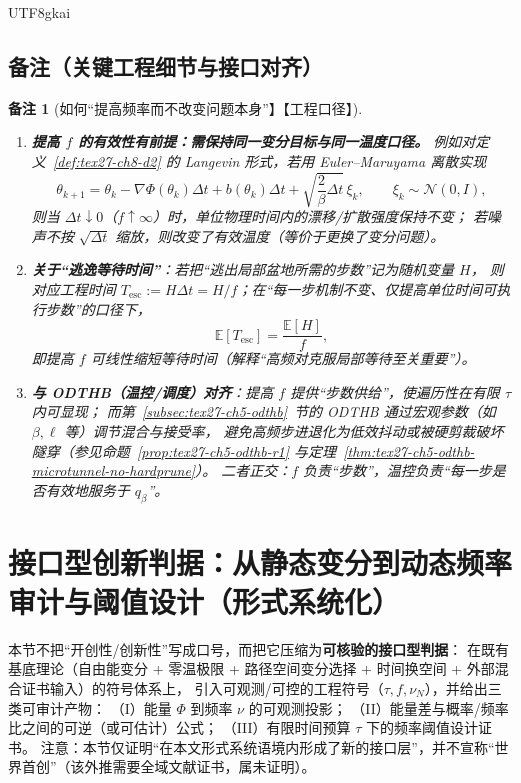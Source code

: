 \documentclass[12pt]{article}
\newtheorem{remark}{备注}[section]
\begin{document}
\begin{CJK*}{UTF8}{gkai}
\subsection{备注（关键工程细节与接口对齐）}
\label{subsec:tex27-ch21-remarks}

\begin{remark}[如何“提高频率而不改变问题本身”】【工程口径】]
\label{rem:tex27-ch21-r1}
\begin{enumerate}
  \item \textbf{提高 $f$ 的有效性有前提：需保持同一变分目标与同一温度口径。}
  例如对定义~\ref{def:tex27-ch8-d2} 的 Langevin 形式，若用 Euler--Maruyama 离散实现
  \[
    \theta_{k+1}
    =\theta_k-\nabla\Phi(\theta_k)\Delta t+b(\theta_k)\Delta t+\sqrt{\frac{2}{\beta}\Delta t}\,\xi_k,
    \qquad
    \xi_k\sim\mathcal{N}(0,I),
  \]
  则当 $\Delta t\downarrow 0$（$f\uparrow\infty$）时，单位物理时间内的漂移/扩散强度保持不变；
  若噪声不按 $\sqrt{\Delta t}$ 缩放，则改变了有效温度（等价于更换了变分问题）。
  \item \textbf{关于“逃逸等待时间”}：若把“逃出局部盆地所需的步数”记为随机变量 $H$，
  则对应工程时间 $T_{\mathrm{esc}}:=H\Delta t=H/f$；在“每一步机制不变、仅提高单位时间可执行步数”的口径下，
  \[
    \mathbb{E}[T_{\mathrm{esc}}]=\frac{\mathbb{E}[H]}{f},
  \]
  即提高 $f$ 可线性缩短等待时间（解释“高频对克服局部等待至关重要”）。
  \item \textbf{与 ODTHB（温控/调度）对齐}：提高 $f$ 提供“步数供给”，使遍历性在有限 $\tau$ 内可显现；
  而第~\ref{subsec:tex27-ch5-odthb}~节的 ODTHB 通过宏观参数（如 $\beta,\ell$ 等）调节混合与接受率，
  避免高频步进退化为低效抖动或被硬剪裁破坏隧穿（参见命题~\ref{prop:tex27-ch5-odthb-r1} 与定理~\ref{thm:tex27-ch5-odthb-microtunnel-no-hardprune}）。
  二者正交：$f$ 负责“步数”，温控负责“每一步是否有效地服务于 $q_\beta$”。
\end{enumerate}
\end{remark}

\clearpage

\section{接口型创新判据：从静态变分到动态频率审计与阈值设计（形式系统化）}
\label{sec:tex27-ch22-interface-innovation}

本节不把“开创性/创新性”写成口号，而把它压缩为\textbf{可核验的接口型判据}：
在既有基底理论（自由能变分 + 零温极限 + 路径空间变分选择 + 时间换空间 + 外部混合证书输入）的符号体系上，
引入可观测/可控的工程符号（$\tau,f,\nu_N$），并给出三类可审计产物：
（I）能量 $\Phi$ 到频率 $\nu$ 的可观测投影；
（II）能量差与概率/频率比之间的可逆（或可估计）公式；
（III）有限时间预算 $\tau$ 下的频率阈值设计证书。
注意：本节仅证明“在本文形式系统语境内形成了新的接口层”，并不宣称“世界首创”（该外推需要全域文献证书，属未证明）。


\end{CJK*}
\end{document}
